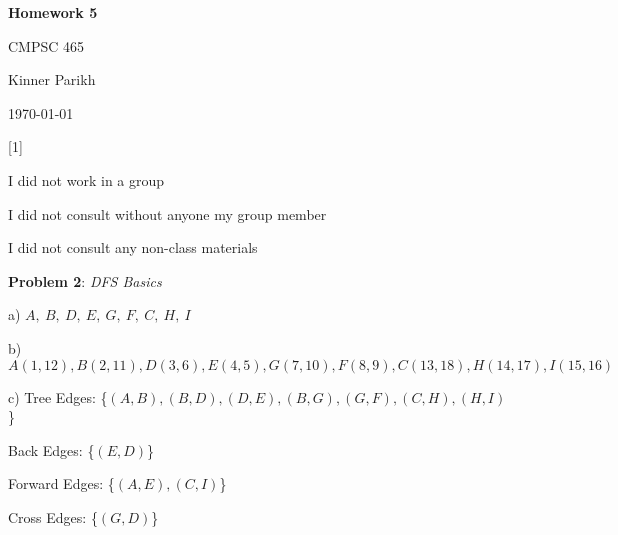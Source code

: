 \documentclass{article} %
\newcommand{\question}[2][]{\begin{flushleft}
        \textbf{Problem #1}: \textit{#2}

\end{flushleft}}
\newcommand{\maketitletwo}[2][]{\begin{center}
        \Large{\textbf{Homework #1}
            
            CMPSC 465} %
        \vspace{5pt}
        
        \normalsize{Kinner Parikh  %
        
        \today}        %
        \vspace{40pt}


        \newpage
        
\end{center}}
\begin{document}
    \maketitletwo[5]  %

    \question[1]{}
    \begin{center}
        
        I did not work in a group
    
        I did not consult without anyone my group member
    
        I did not consult any non-class materials
    \end{center}
    
    \newpage

    \question[2]{DFS Basics}

    a) $A,\ B,\ D,\ E,\ G,\ F,\ C,\ H,\ I$

    \vspace{5pt}

    
    b) $A(1, 12), B(2, 11), D(3, 6), E(4, 5), G(7, 10), F(8, 9), C(13, 18), H(14, 17), I(15, 16)$
    
    \vspace{5pt}
    
    c) Tree Edges: \hspace{16pt}\{$(A, B), (B, D), (D, E), (B, G), (G, F), (C, H), (H, I)$\}
    
    \hspace{12pt}Back Edges: \hspace{14pt}\{$(E, D)$\}
    
    \hspace{12pt}Forward Edges: \{$(A, E), (C, I)$\}
    
    \hspace{12pt}Cross Edges: \hspace{12pt}\{$(G, D)$\}
\end{document}
